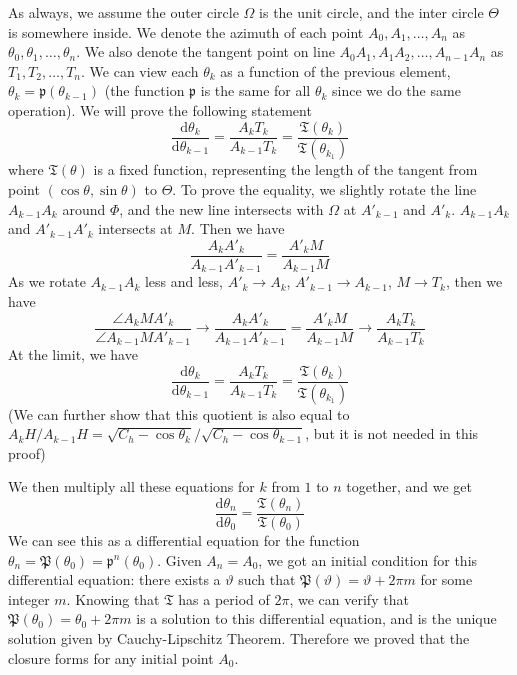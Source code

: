 \documentclass[]{article}
\newcommand{\ud}{\mathrm{d}}
\begin{document}
As always, we assume the outer circle $\Omega$ is the unit circle, and the inter circle $\Theta$ is somewhere inside. We denote the azimuth of each point $A_0, A_1,\dots,A_n$ as $\theta_0,\theta_1,\dots,\theta_n$. We also denote the tangent point on line $A_0A_1, A_1A_2,\dots,A_{n-1}A_n$ as $T_1, T_2,\dots, T_n$. We can view each $\theta_k$ as a function of the previous element, $\theta_k=\mathfrak{p}(\theta_{k-1})$ (the function $\mathfrak{p}$ is the same for all $\theta_k$ since we do the same operation). We will prove the following statement
\[
\frac{\ud \theta_{k}}{\ud \theta_{k-1}} = \frac{A_kT_k}{A_{k-1}T_{k}} = \frac{\mathfrak{T}(\theta_{k})}{\mathfrak{T}(\theta_{k_1})}
\]
where $\mathfrak{T}(\theta)$ is a fixed function, representing the length of the tangent from point $(\cos\theta, \sin\theta)$ to $\Theta$. To prove the equality, we slightly rotate the line $A_{k-1} A_k$ around $\Phi$, and the new line intersects with $\Omega$ at $A'_{k-1}$ and $A'_k$. $A_{k-1} A_k$ and $A'_{k-1} A'_k$ intersects at $M$. Then we have
\[
\frac{A_k A'_k}{A_{k-1}A'_{k-1}} = \frac{A'_{k}M}{A_{k-1}M}
\]
As we rotate $A_{k-1} A_k$ less and less, $A'_k \to A_k$, $A'_{k-1} \to A_{k-1}$, $M\to T_k$, then we have
\[
\frac{\angle A_k M  A'_k}{\angle A_{k-1} M A'_{k-1}} \to \frac{A_k A'_k}{A_{k-1}A'_{k-1}} = \frac{A'_{k}M}{A_{k-1}M} \to \frac{A_{k}T_k}{A_{k-1}T_k}
\]
At the limit, we have
\[
\frac{\ud \theta_{k}}{\ud \theta_{k-1}} = \frac{A_kT_k}{A_{k-1}T_{k}} =  \frac{\mathfrak{T}(\theta_{k})}{\mathfrak{T}(\theta_{k_1})}
\]
(We can further show that this quotient is also equal to $A_kH/A_{k-1}H = \sqrt{C_h-\cos\theta_k}/\sqrt{C_h-\cos\theta_{k-1}}$, but it is not needed in this proof)

We then multiply all these equations for $k$ from $1$ to $n$ together, and we get
\[
\frac{\ud \theta_{n}}{\ud \theta_{0}}  = \frac{\mathfrak{T}(\theta_{n})}{\mathfrak{T}(\theta_{0})}
\]
We can see this as a differential equation for the function $\theta_n = \mathfrak{P}(\theta_0) =\mathfrak{p}^n(\theta_0)$. Given $A_n = A_0$, we got an initial condition for this differential equation: there exists a $\vartheta$ such that $\mathfrak{P}(\vartheta) = \vartheta + 2\pi m$ for some integer $m$. Knowing that $\mathfrak{T}$ has a period of $2\pi$, we can verify that $\mathfrak{P}(\theta_0) = \theta_0 + 2\pi m$ is a solution to this differential equation, and is the unique solution given by Cauchy-Lipschitz Theorem. Therefore we proved that the closure forms for any initial point $A_0$.
 
\end{document}

